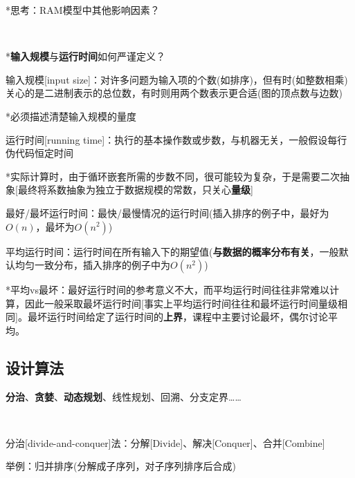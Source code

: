 \documentclass[a4paper,UTF8,fontset=windows]{ctexart}
\begin{document}
*\hspace{0em}思考：RAM模型中其他影响因素？

\

*\hspace{0em}\textbf{输入规模}与\textbf{运行时间}如何严谨定义？

输入规模[input size]：对许多问题为输入项的个数(如排序)，但有时(如整数相乘)关心的是二进制表示的总位数，有时则用两个数表示更合适(图的顶点数与边数)

*\hspace{0em}必须描述清楚输入规模的量度

运行时间[running time]：执行的基本操作数或步数，与机器无关，一般假设每行伪代码恒定时间

*\hspace{0em}实际计算时，由于循环嵌套所需的步数不同，很可能较为复杂，于是需要二次抽象[最终将系数抽象为独立于数据规模的常数，只关心\textbf{量级}]

最好/最坏运行时间：最快/最慢情况的运行时间(插入排序的例子中，最好为$O(n)$，最坏为$O(n^2)$)

平均运行时间：运行时间在所有输入下的期望值(\textbf{与数据的概率分布有关}，一般默认均匀一致分布，插入排序的例子中为$O(n^2)$)

*\hspace{0em}平均vs最坏：最好运行时间的参考意义不大，而平均运行时间往往非常难以计算，因此一般采取最坏运行时间[事实上平均运行时间往往和最坏运行时间量级相同]。最坏运行时间给定了运行时间的\textbf{上界}，课程中主要讨论最坏，偶尔讨论平均。

\subsection{设计算法}

\textbf{分治}、\textbf{贪婪}、\textbf{动态规划}、线性规划、回溯、分支定界……

\

分治[divide-and-conquer]法：分解[Divide]、解决[Conquer]、合并[Combine]

举例：归并排序(分解成子序列，对子序列排序后合成)
\end{document}
